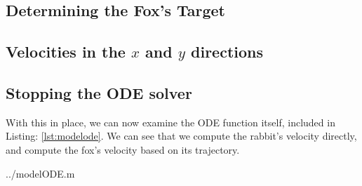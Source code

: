 \subsection {Determining the Fox's Target} \label{lbl:foxtarget}



\subsection {Velocities in the $x$ and $y$ directions}



\subsection {Stopping the ODE solver}



With this in place, we can now examine the ODE function itself, included in Listing: \ref{lst:modelode}. We can see that we compute the rabbit's velocity directly, and compute the fox's velocity based on its trajectory.

  {../modelODE.m}





